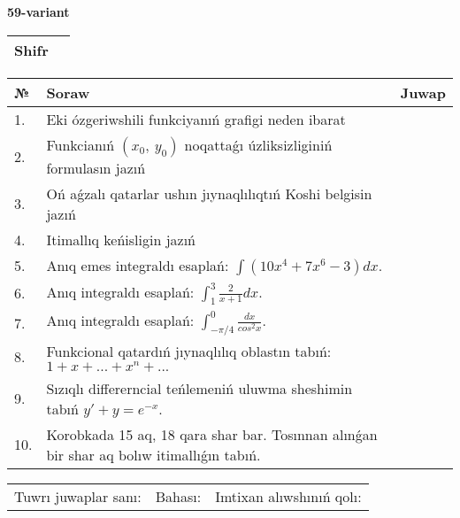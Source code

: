 \documentclass{article}
\begin{document}
  \egroup
  
  \newpage
  
  
  \textbf{59-variant}\\
  
  \bgroup
  \def\arraystretch{1.6} %
  
  \begin{tabular}{|m{5.7cm}|m{9.5cm}|}
  \hline
  Shifr & \\
  \hline
  \end{tabular}
  
  \vspace{1cm}
  
  \begin{tabular}{|m{0.7cm}|m{10cm}|m{4cm}|}
  \hline
  № & Soraw & Juwap \\
  \hline
  1. & Eki ózgeriwshili funkciyanıń grafigi neden ibarat &  \\
  \hline
  2. & Funkcianıń \((x_{0},\ y_{0})\) noqattaǵı úzliksizliginiń formulasın jazıń &  \\
  \hline
  3. & Oń aǵzalı qatarlar ushın jıynaqlılıqtıń Koshi belgisin jazıń &  \\
  \hline
  4. & Itimallıq keńisligin jazıń &  \\
  \hline
  5. & Anıq emes integraldı esaplań: \(\int{\left( 10x^{4} + 7x^{6} - 3 \right)dx}\). &  \\
  \hline
  6. & Anıq integraldı esaplań: \(\int_{1}^{3}\frac{2}{x + 1}dx\). &  \\
  \hline
  7. & Anıq integraldı esaplań: \(\int_{- \pi/4}^{0}\frac{dx}{cos^2 x}\). &  \\
  \hline
  8. & Funkcional qatardıń jıynaqlılıq oblastın tabıń:\(1 + x + ... + x^{n} + ...\) &  \\
  \hline
  9. & Sızıqlı differerncial teńlemeniń uluwma sheshimin tabıń \(y' + y = e^{- x}\). &  \\
  \hline
  10. & Korobkada 15 aq, 18 qara shar bar. Tosınnan alınǵan bir shar aq bolıw itimallıǵın tabıń. &  \\
  \hline
  \end{tabular}
  
  \vspace{1cm}
  
  \begin{tabular}{lll}
  Tuwrı juwaplar sanı: \underline{\hspace{1.5cm}} & 
  Bahası: \underline{\hspace{1.5cm}} & 
  Imtixan alıwshınıń qolı: \underline{\hspace{2cm}} \\
  \end{tabular}
  
\end{document}

